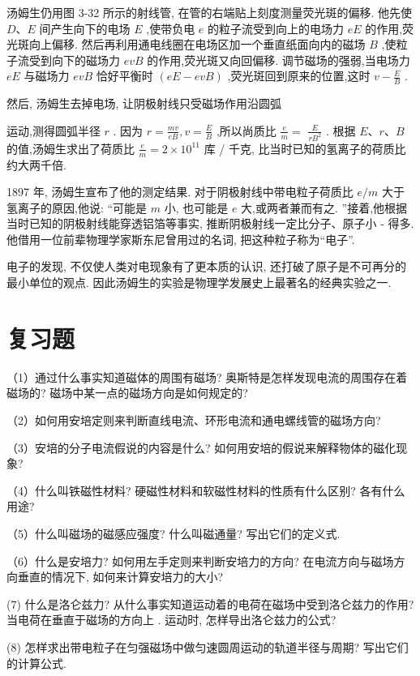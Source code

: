 \documentclass[10pt]{article}
\begin{document}
汤姆生仍用图 3-32 所示的射线管, 在管的右端贴上刻度测量荧光斑的偏移. 他先使 \(D\text{、}E\) 间产生向下的电场 \(E\) ,使带负电 \(e\) 的粒子流受到向上的电场力 \({eE}\) 的作用,荧光斑向上偏移. 然后再利用通电线圈在电场区加一个垂直纸面向内的磁场 \(B\) ,使粒子流受到向下的磁场力 \({evB}\) 的作用,荧光斑又向回偏移. 调节磁场的强弱,当电场力 \({eE}\) 与磁场力 \({evB}\) 恰好平衡时 \(\left( {{eE} - {evB}}\right)\) ,荧光斑回到原来的位置,这时 \(v - \frac{E}{B}\) .

然后, 汤姆生去掉电场, 让阴极射线只受磁场作用沿圆弧

运动,测得圆弧半径 \(r\) . 因为 \(r = \frac{mv}{eB},v = \frac{E}{B}\) ,所以尚质比 \(\frac{e}{m} =\) \(\frac{E}{r{B}^{2}}\) . 根据 \(E\text{、}r\text{、}B\) 的值,汤姆生求出了荷质比 \(\frac{e}{m} = 2 \times {10}^{11}\) 库 / 千克, 比当时已知的氢离子的荷质比约大两千倍.

1897 年, 汤姆生宣布了他的测定结果. 对于阴极射线中带电粒子荷质比 \(e/m\) 大于氢离子的原因,他说: “可能是 \(m\) 小, 也可能是 \(e\) 大,或两者兼而有之. ”接着,他根据当时已知的阴极射线能穿透铝箔等事实, 推断阴极射线一定比分子、原子小 - 得多. 他借用一位前辈物理学家斯东尼曾用过的名词, 把这种粒子称为“电子”.

电子的发现, 不仅使人类对电现象有了更本质的认识, 还打破了原子是不可再分的最小单位的观点. 因此汤姆生的实验是物理学发展史上最著名的经典实验之一.

\section*{复习题}

（1）通过什么事实知道磁体的周围有磁场? 奥斯特是怎样发现电流的周围存在着磁场的? 磁场中某一点的磁场方向是如何规定的?

（2）如何用安培定则来判断直线电流、环形电流和通电螺线管的磁场方向?

（3）安培的分子电流假说的内容是什么? 如何用安培的假说来解释物体的磁化现象?

（4）什么叫铁磁性材料? 硬磁性材料和软磁性材料的性质有什么区别? 各有什么用途?

（5）什么叫磁场的磁感应强度? 什么叫磁通量? 写出它们的定义式.

（6）什么是安培力? 如何用左手定则来判断安培力的方向? 在电流方向与磁场方向垂直的情况下, 如何来计算安培力的大小?

(7) 什么是洛仑兹力? 从什么事实知道运动着的电荷在磁场中受到洛仑兹力的作用? 当电荷在垂直于磁场的方向上 . 运动时, 怎样导出洛仑兹力的公式?

(8) 怎样求出带电粒子在匀强磁场中做匀速圆周运动的轨道半径与周期? 写出它们的计算公式.
\end{document}
